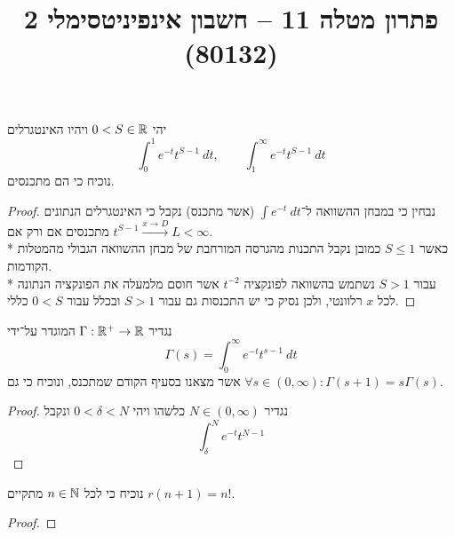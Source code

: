 
\usepackage{tikz}
\DeclareMathOperator\arcsinh{arcsinh}
\title{פתרון מטלה 11 – חשבון אינפיניטסימלי 2 (80132)}


\maketitle
\maketitleprint{}

\Question{}
\Subquestion{}
יהי $0 < S \in \mathbb{R}$ ויהיו האינטגרלים
\[
	\int_{0}^{1} e^{-t} t^{S - 1}\ dt,
	\qquad
	\int_{1}^{\infty} e^{-t} t^{S - 1}\ dt
\]
נוכיח כי הם מתכנסים.
\begin{proof}
	נבחין כי במבחן ההשוואה ל־$\int e^{-t}\ dt$ (אשר מתכנס) נקבל כי האינטגרלים הנתונים מתכנסים אם ורק אם $t^{S - 1} \xrightarrow{x \to D} L < \infty$. \\*
	כאשר $S \le 1$ כמובן נקבל התכנות מהגרסה המורחבת של מבחן ההשוואה הגבולי מהמטלות הקודמות. \\*
	עבור $S > 1$ נשתמש בהשוואה לפונקציה $t^{-2}$ אשר חוסם מלמעלה את הפונקציה הנתונה לכל $x$ רלוונטי, ולכן נסיק כי יש התכנסות גם עבור $S > 1$ ובכלל עבור $0 < S$ כללי.
\end{proof}

\Subquestion{}
נגדיר $\Gamma : \mathbb{R}^+ \to \mathbb{R}$ המוגדר על־ידי
\[
	\Gamma(s) = \int_{0}^{\infty} e^{-t} t^{s - 1}\ dt
\]
אשר מצאנו בסעיף הקודם שמתכנס, ונוכיח כי גם $\forall s \in (0, \infty) : \Gamma(s + 1) = s \Gamma(s)$.
\begin{proof}
	נגדיר $N \in (0, \infty)$ כלשהו ויהי $0 < \delta < N$ ונקבל
	\[
		\int_{\delta}^{N} e^{-t} t^{N - 1}
	\]
\end{proof}

\Subquestion{}
נוכיח כי לכל $n \in \mathbb{N}$ מתקיים $r(n + 1) = n! $.
\begin{proof}
	
\end{proof}

